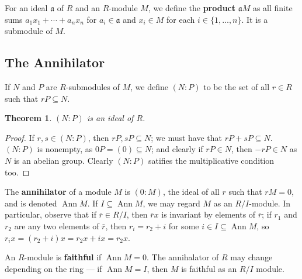 \documentclass[11pt]{article}
\newtheorem{theorem}{Theorem}
\newcommand{\Ann}{\operatorname{Ann}}
\begin{document}
For an ideal $\mathfrak{a}$ of $R$ and an $R$-module $M$, we define the \textbf{product} $\mathfrak{a} M$ as all finite sums $a_{1}x_{1} + \cdots + a_{n}x_{n}$ for $a_{i} \in \mathfrak{a}$ and $x_{i} \in M$  for each $i \in \{ 1, \ldots, n \}$. It is a submodule of $M$.


\subsection{The Annihilator}

If $N$ and $P$ are $R$-submodules of $M$, we define $(N : P)$ to be the set of all $r \in R$ such that $rP \subseteq N$.

\newpage

\begin{adjustwidth}{0.5cm}{}
	\begin{theorem}
		$(N : P)$ is an ideal of $R$.
	\end{theorem}
	\begin{proof}
		If $r, s \in (N : P)$, then $rP, sP \subseteq N$; we must have that $rP + sP \subseteq N$. $(N : P)$ is nonempty, as $0P = (0) \subseteq N$; and clearly if $rP \in N$, then $-rP \in N$ as $N$ is an abelian group. Clearly $(N : P)$ satifies the multiplicative condition too.
	\end{proof}
\end{adjustwidth}

The \textbf{annihilator} of a module $M$ is $(0 : M)$, the ideal of all $r$ such that $rM = 0$, and is denoted $\Ann M$. If $I \subseteq \Ann M$, we may regard $M$ as an $R / I$-module. In particular, observe that if $\bar{r} \in R / I$, then $\bar{r}x$ is invariant by elements of $\bar{r}$; if $r_{1}$ and $r_{2}$ are any two elements of $\bar{r}$, then $r_{i} = r_{2} + i$ for some $i \in I \subseteq \Ann M$, so $r_{i}x = (r_{2} + i)x = r_{2}x + ix = r_{2}x$.

An $R$-module is \textbf{faithful} if $\Ann M = 0$. The annihalator of $R$ may change depending on the ring --- if $\Ann M = I$, then $M$ is faithful as an $R / I$ module.
\end{document}
